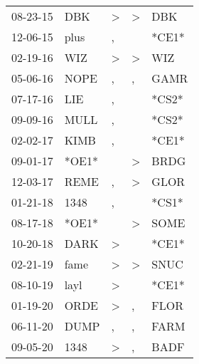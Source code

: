\begin{supertabular}{lllll}
 08-23-15 &    DBK &  \textgreater &     \textgreater &    DBK \\
 12-06-15 &   plus &             , &                  &  *CE1* \\
 02-19-16 &    WIZ &  \textgreater &     \textgreater &    WIZ \\
 05-06-16 &   NOPE &             , &                , &   GAMR \\
 07-17-16 &    LIE &             , &                  &  *CS2* \\
 09-09-16 &   MULL &             , &                  &  *CS2* \\
 02-02-17 &   KIMB &             , &                  &  *CE1* \\
 09-01-17 &  *OE1* &               &     \textgreater &   BRDG \\
 12-03-17 &   REME &             , &     \textgreater &   GLOR \\
 01-21-18 &   1348 &             , &                  &  *CS1* \\
 08-17-18 &  *OE1* &               &     \textgreater &   SOME \\
 10-20-18 &   DARK &  \textgreater &                  &  *CE1* \\
 02-21-19 &   fame &  \textgreater &     \textgreater &   SNUC \\
 08-10-19 &   layl &  \textgreater &                  &  *CE1* \\
 01-19-20 &   ORDE &  \textgreater &                , &   FLOR \\
 06-11-20 &   DUMP &             , &                , &   FARM \\
 09-05-20 &   1348 &  \textgreater &                , &   BADF \\
\end{supertabular}
